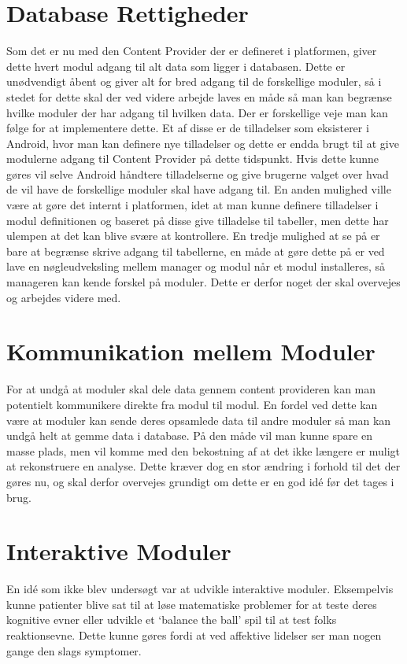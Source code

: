 \section{Database Rettigheder}\label{databaserettigheder}
Som det er nu med den Content Provider der er defineret i platformen, giver dette hvert modul adgang til alt data som ligger i databasen.
Dette er unødvendigt åbent og giver alt for bred adgang til de forskellige moduler, så i stedet for dette skal der ved videre arbejde laves en måde så man kan begrænse hvilke moduler der har adgang til hvilken data.
Der er forskellige veje man kan følge for at implementere dette.  
Et af disse er de tilladelser som eksisterer i Android, hvor man kan definere nye tilladelser og dette er endda brugt til at give modulerne adgang til Content Provider på dette tidspunkt.
Hvis dette kunne gøres vil selve Android håndtere tilladelserne og give brugerne valget over hvad de vil have de forskellige moduler skal have adgang til.
En anden mulighed ville være at gøre det internt i platformen, idet at man kunne definere tilladelser i modul definitionen og baseret på disse give tilladelse til tabeller, men dette har ulempen at det kan blive svære at kontrollere. 
En tredje mulighed at se på er bare at begrænse skrive adgang til tabellerne, en måde at gøre dette på er ved lave en nøgleudveksling mellem manager og modul når et modul installeres, så manageren kan kende forskel på moduler.
Dette er derfor noget der skal overvejes og arbejdes videre med. 

\section{Kommunikation mellem Moduler}
For at undgå at moduler skal dele data gennem content provideren kan man potentielt kommunikere direkte fra modul til modul.
En fordel ved dette kan være at moduler kan sende deres opsamlede data til andre moduler så man kan undgå helt at gemme data i database.
På den måde vil man kunne spare en masse plads, men vil komme med den bekostning af at det ikke længere er muligt at rekonstruere en analyse.
Dette kræver dog en stor ændring i forhold til det der gøres nu, og skal derfor overvejes grundigt om dette er en god idé før det tages i brug.

\section{Interaktive Moduler}
En idé som ikke blev undersøgt var at udvikle interaktive moduler.
Eksempelvis kunne patienter blive sat til at løse matematiske problemer for at teste deres kognitive evner eller udvikle et `balance the ball' spil til at test folks reaktionsevne.
Dette kunne gøres fordi at ved affektive lidelser ser man nogen gange den slags symptomer. 

